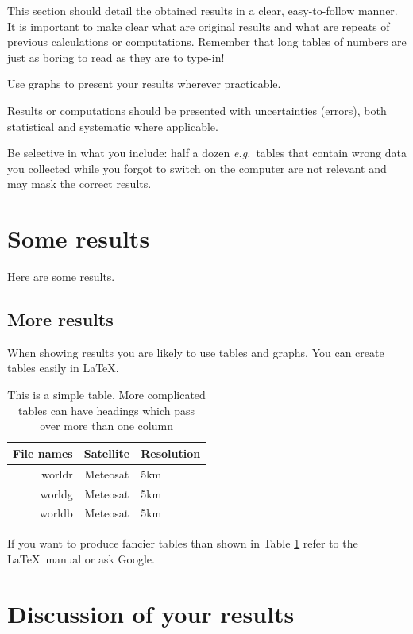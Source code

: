 \documentclass[12pt,a4paper]{report}
\begin{document}
This section should detail the obtained results in a clear,
easy-to-follow manner. It is important to make clear what are original
results and what are repeats of previous calculations or computations.
Remember that long tables of numbers are just as boring to read as
they are to type-in!

Use graphs to present your results wherever practicable.

Results or computations should be presented with uncertainties
(errors), both statistical and systematic where applicable.

Be selective in what you include: half a dozen \emph{e.g.}~tables that
contain wrong data you collected while you forgot to switch on the
computer are not relevant and may mask the correct results.


\section{Some results}
Here are some results.

\subsection{More results}
When showing results you are likely to use tables and graphs. You can
create tables easily in \LaTeX.

\begin{table}[h]
\begin{center}
\begin{tabular}{||r|c|l||}
\hline
\textbf{File names} & \textbf{Satellite} & \textbf{Resolution}\\
\hline
  worldr            &  Meteosat          &   5km\\
  worldg            &  Meteosat          &   5km\\
  worldb            &  Meteosat          &   5km\\
\hline
\end{tabular}
\end{center}
\caption{This is a simple table. More complicated tables can have
headings which pass over more than one column}
\label{simple_table}
\end{table}

If you want to produce fancier tables than shown in Table \ref{simple_table}
refer to the \LaTeX\ manual or ask Google.

\section{Discussion of your results}
\end{document}
